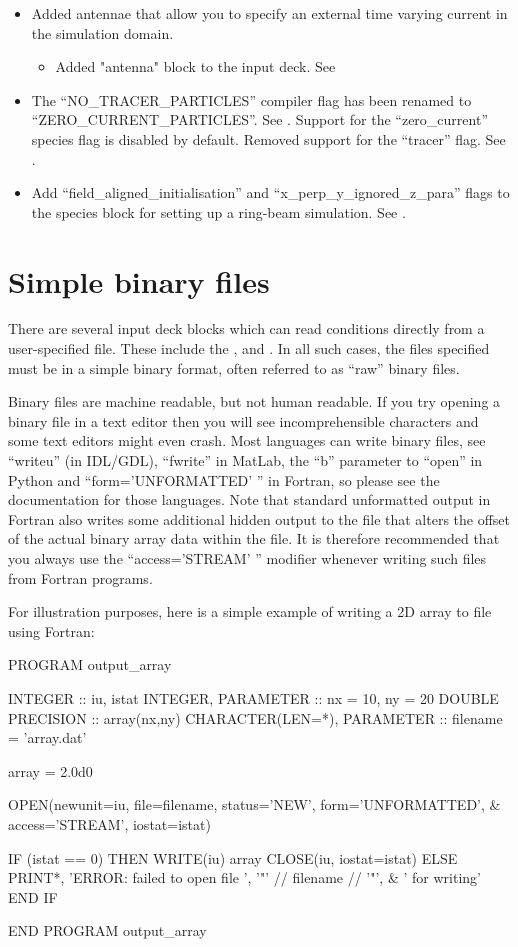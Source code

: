 \begin{itemize}
\item Added antennae that allow you to specify an external time varying current
    in the simulation domain.
\begin{itemize}
\item Added "antenna" block to the input deck. See 
\end{itemize}
\item The ``NO\_TRACER\_PARTICLES'' compiler flag has been renamed to
    ``ZERO\_CURRENT\_PARTICLES''. See . Support for the
    ``zero\_current'' species flag is disabled by default. Removed support
    for the ``tracer'' flag. See .
\item Add ``field\_aligned\_initialisation'' and
    ``x\_perp\_y\_ignored\_z\_para'' flags to the species block for setting
    up a ring-beam simulation. See .
\end{itemize}
\bigskip

\section{Simple binary files}
\label{sec:binaryfile}
There are several input deck blocks which can read conditions directly from
a user-specified file. These include the ,
 and . In all such cases,
the files specified must be in a simple binary format, often referred to
as ``raw'' binary files.

Binary files are machine readable, but not human readable. If you try opening
a binary file in a text editor then you will see incomprehensible characters
and some text editors might even crash. Most languages can write binary files,
see ``writeu'' (in IDL/GDL), ``fwrite'' in MatLab, the ``b'' parameter to
``open'' in Python and ``form='UNFORMATTED' '' in Fortran, so please see the
documentation for those languages. Note that standard unformatted output in
Fortran also writes some additional hidden output to the file that alters the
offset of the actual binary array data within the file. It is therefore
recommended that you always use the ``access='STREAM' '' modifier whenever
writing such files from Fortran programs.

For illustration purposes, here is a simple example of writing a 2D array
to file using Fortran:
\begin{boxverbatim}
PROGRAM output_array

  INTEGER :: iu, istat
  INTEGER, PARAMETER :: nx = 10, ny = 20
  DOUBLE PRECISION :: array(nx,ny)
  CHARACTER(LEN=*), PARAMETER :: filename = 'array.dat'

  array = 2.0d0

  OPEN(newunit=iu, file=filename, status='NEW', form='UNFORMATTED', &
       access='STREAM', iostat=istat)

  IF (istat == 0) THEN
    WRITE(iu) array
    CLOSE(iu, iostat=istat)
  ELSE
    PRINT*, 'ERROR: failed to open file ', '"' // filename // '"', &
            ' for writing'
  END IF

END PROGRAM output_array
\end{boxverbatim}

